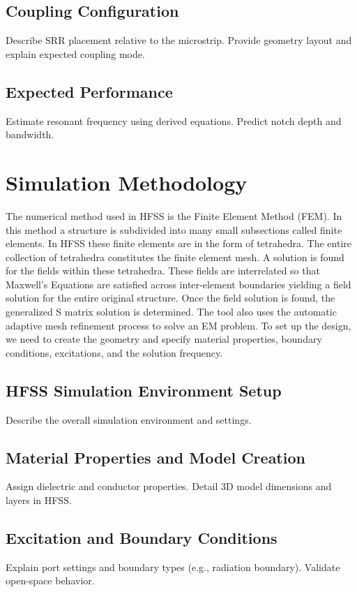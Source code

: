 \documentclass[conference]{IEEEtran}
\begin{document}
\subsection{Coupling Configuration}
Describe SRR placement relative to the microstrip. Provide geometry layout and explain expected coupling mode.

\subsection{Expected Performance}
Estimate resonant frequency using derived equations. Predict notch depth and bandwidth.

\section{Simulation Methodology}
The numerical method used in HFSS is the Finite Element Method (FEM). In this method a structure is subdivided into many small subsections called finite elements. In HFSS these finite elements are in the form of tetrahedra. The entire collection of tetrahedra constitutes the finite element mesh. A solution is found for the fields within these tetrahedra. These fields are
interrelated so that Maxwell’s Equations are satisfied across inter-element boundaries yielding a field solution for the entire original structure. Once the field solution is found, the generalized S matrix solution is determined.
The tool also uses the automatic adaptive mesh refinement process to solve an EM problem. To set up the design, we need to create the geometry and specify material properties, boundary conditions, excitations, and the solution frequency.


\subsection{HFSS Simulation Environment Setup}
Describe the overall simulation environment and settings.

\subsection{Material Properties and Model Creation}
Assign dielectric and conductor properties. Detail 3D model dimensions and layers in HFSS.

\subsection{Excitation and Boundary Conditions}
Explain port settings and boundary types (e.g., radiation boundary). Validate open-space behavior.
\end{document}
